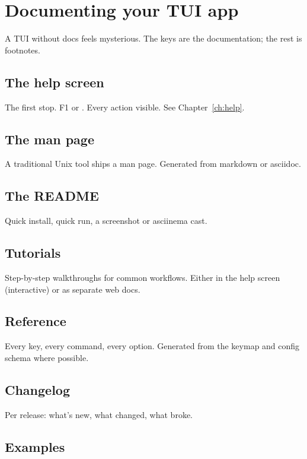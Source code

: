 \chapter{Documenting your TUI app}
\label{ch:docs}

\begin{aside}
A TUI without docs feels mysterious. The keys are the
documentation; the rest is footnotes.
\end{aside}

\section{The help screen}

The first stop. F1 or . Every action visible.
See Chapter~\ref{ch:help}.

\section{The man page}

A traditional Unix tool ships a man page. Generated from
markdown or asciidoc.

\section{The README}

Quick install, quick run, a screenshot or asciinema cast.

\section{Tutorials}

Step-by-step walkthroughs for common workflows. Either in
the help screen (interactive) or as separate web docs.

\section{Reference}

Every key, every command, every option. Generated from
the keymap and config schema where possible.

\section{Changelog}

Per release: what's new, what changed, what broke.

\section{Examples}

